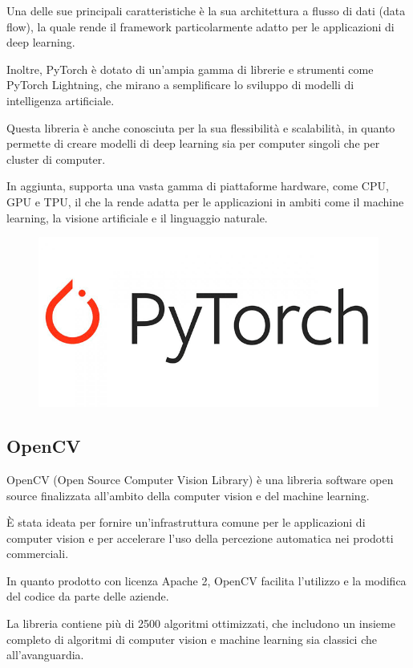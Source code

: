 Una delle sue principali caratteristiche è la sua architettura a flusso di dati (data flow), la quale rende il framework particolarmente adatto per le applicazioni di deep learning. 

Inoltre, PyTorch è dotato di un'ampia gamma di librerie e strumenti come PyTorch Lightning, che mirano a semplificare lo sviluppo di modelli di intelligenza artificiale.

Questa libreria è anche conosciuta per la sua flessibilità e scalabilità, in quanto permette di creare modelli di deep learning sia per computer singoli che per cluster di computer. 

In aggiunta, supporta una vasta gamma di piattaforme hardware, come CPU, GPU e TPU, il che la rende adatta per le applicazioni in ambiti come il machine learning, la visione artificiale e il linguaggio naturale.

\begin{figure}
    \begin{center}    
        \includegraphics[width=0.9\linewidth]{images/image7.png}
    \end{center}
\end{figure}

\subsection{OpenCV}
OpenCV (Open Source Computer Vision Library) \cite{OpenCv} è una libreria software open source finalizzata all’ambito della computer vision e del machine learning. 

È stata ideata per fornire un'infrastruttura comune per le applicazioni di computer vision e per accelerare l'uso della percezione automatica nei prodotti commerciali. 

In quanto prodotto con licenza Apache 2, OpenCV facilita l'utilizzo e la modifica del codice da parte delle aziende.

La libreria contiene più di 2500 algoritmi ottimizzati, che includono un insieme completo di algoritmi di computer vision e machine learning sia classici che all'avanguardia. 


